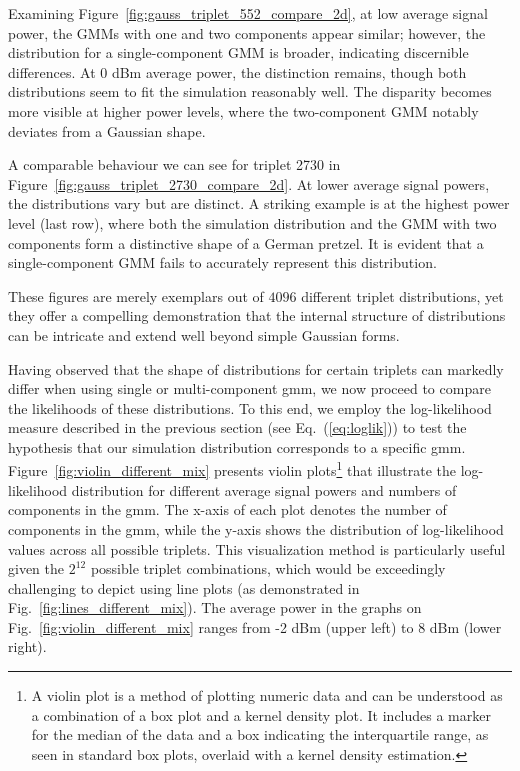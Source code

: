 Examining Figure~\ref{fig:gauss_triplet_552_compare_2d}, at low average signal power, the GMMs with one and two components appear similar; however, the distribution for a single-component GMM is broader, indicating discernible differences. At \(0\) dBm average power, the distinction remains, though both distributions seem to fit the simulation reasonably well. The disparity becomes more visible at higher power levels, where the two-component GMM notably deviates from a Gaussian shape.

A comparable behaviour we can see for triplet 2730 in Figure~\ref{fig:gauss_triplet_2730_compare_2d}. At lower average signal powers, the distributions vary but are distinct. A striking example is at the highest power level (last row), where both the simulation distribution and the GMM with two components form a distinctive shape of a German pretzel. It is evident that a single-component GMM fails to accurately represent this distribution.

These figures are merely exemplars out of \(4096\) different triplet distributions, yet they offer a compelling demonstration that the internal structure of distributions can be intricate and extend well beyond simple Gaussian forms.




Having observed that the shape of distributions for certain triplets can markedly differ when using single or multi-component \gls{gmm}, we now proceed to compare the likelihoods of these distributions. To this end, we employ the log-likelihood measure described in the previous section (see Eq.~(\ref{eq:loglik})) to test the hypothesis that our simulation distribution corresponds to a specific \gls{gmm}. Figure~\ref{fig:violin_different_mix} presents violin plots\footnote{A violin plot is a method of plotting numeric data and can be understood as a combination of a box plot and a kernel density plot. It includes a marker for the median of the data and a box indicating the interquartile range, as seen in standard box plots, overlaid with a kernel density estimation.} that illustrate the log-likelihood distribution for different average signal powers and numbers of components in the \gls{gmm}. The x-axis of each plot denotes the number of components in the \gls{gmm}, while the y-axis shows the distribution of log-likelihood values across all possible triplets. This visualization method is particularly useful given the \(2^{12}\) possible triplet combinations, which would be exceedingly challenging to depict using line plots (as demonstrated in Fig.~\ref{fig:lines_different_mix}). The average power in the graphs on Fig.~\ref{fig:violin_different_mix} ranges from -2 dBm (upper left) to 8 dBm (lower right).


